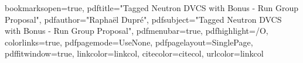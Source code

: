 
\usepackage{hyperref}
\hypersetup
{
bookmarksopen=true,
pdftitle="Tagged Neutron DVCS with Bonus - Run Group Proposal",
pdfauthor="Rapha\"el Dupr\'e", 
pdfsubject="Tagged Neutron DVCS with Bonus - Run Group Proposal", %
pdfmenubar=true, %
pdfhighlight=/O, %
colorlinks=true, %
pdfpagemode=UseNone, %
pdfpagelayout=SinglePage, %
pdffitwindow=true, %
linkcolor=linkcol, %
citecolor=citecol, %
urlcolor=linkcol %
}

